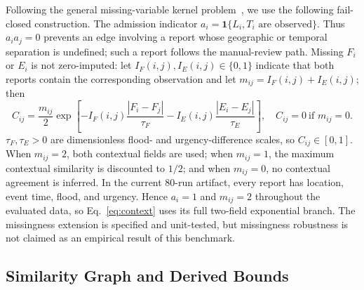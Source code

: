 \documentclass[runningheads]{llncs}
\begin{document}
Following the general missing-variable kernel problem~\cite{smola2005missing},
we use the following fail-closed construction. The admission indicator
$a_i=\mathbf{1}\{L_i,T_i\text{ are observed}\}$.
Thus $a_i a_j=0$ prevents an edge involving a report whose geographic or
temporal separation is undefined; such a report follows the manual-review
path. Missing $F_i$ or $E_i$ is not zero-imputed: let
$I_F(i,j),I_E(i,j)\in\{0,1\}$ indicate that both reports contain the
corresponding observation and let
$m_{ij}=I_F(i,j)+I_E(i,j)$; then
\begin{equation}
C_{ij}=\frac{m_{ij}}{2}\exp\!\left[-I_F(i,j)\frac{|F_i-F_j|}{\tau_F}
-I_E(i,j)\frac{|E_i-E_j|}{\tau_E}\right],
\quad C_{ij}=0\ \text{if }m_{ij}=0.
\label{eq:context}
\end{equation}
$\tau_F,\tau_E>0$ are dimensionless flood- and urgency-difference scales, so
$C_{ij}\in[0,1]$. When $m_{ij}=2$, both contextual fields are used; when
$m_{ij}=1$, the
maximum contextual similarity is discounted to $1/2$; and when $m_{ij}=0$,
no contextual agreement is inferred. In the current 80-run artifact, every
report has location, event time, flood, and urgency. Hence $a_i=1$ and
$m_{ij}=2$ throughout the evaluated data, so Eq.~\ref{eq:context} uses its
full two-field exponential branch.
The missingness extension is specified and unit-tested, but missingness
robustness is not claimed as an empirical result of this benchmark.

\subsection{Similarity Graph and Derived Bounds}
\end{document}
